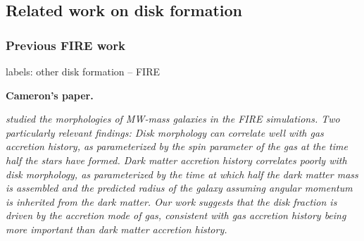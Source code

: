 \documentclass[fleqn,usenatbib]{mnras}
\begin{document}


\subsection{Related work on disk formation}
\label{s: other disk formation}

\subsubsection{Previous FIRE work}
label{s: other disk formation -- FIRE}

\textbf{Cameron's paper.}

\textit{
\cite{Garrison-Kimmel2018} studied the morphologies of MW-mass galaxies in the FIRE simulations.
Two particularly relevant findings:
Disk morphology can correlate well with gas accretion history, as parameterized by the spin parameter of the gas at the time half the stars have formed.
Dark matter accretion history correlates poorly with disk morphology, as parameterized by the time at which half the dark matter mass is assembled and the predicted radius of the galaxy assuming angular momentum is inherited from the dark matter.
Our work suggests that the disk fraction is driven by the accretion mode of gas, consistent with gas accretion history being more important than dark matter accretion history.
}
\end{document}
